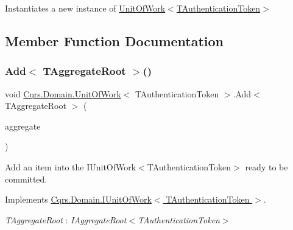 Instantiates a new instance of \hyperlink{classCqrs_1_1Domain_1_1UnitOfWork_a9ec92dbd580f3885f7cf5a9ad360e1ac_a9ec92dbd580f3885f7cf5a9ad360e1ac}{Unit\+Of\+Work$<$\+T\+Authentication\+Token$>$} 



\subsection{Member Function Documentation}
\mbox{\label{classCqrs_1_1Domain_1_1UnitOfWork_a840214f97d3661c7b5a739df65fadc9f_a840214f97d3661c7b5a739df65fadc9f}} 
\subsubsection{\texorpdfstring{Add$<$ T\+Aggregate\+Root $>$()}{Add< TAggregateRoot >()}}
{\footnotesize\ttfamily void \hyperlink{classCqrs_1_1Domain_1_1UnitOfWork}{Cqrs.\+Domain.\+Unit\+Of\+Work}$<$ T\+Authentication\+Token $>$.Add$<$ T\+Aggregate\+Root $>$ (\begin{DoxyParamCaption}\item[{T\+Aggregate\+Root}]{aggregate }\end{DoxyParamCaption})}



Add an item into the I\+Unit\+Of\+Work$<$\+T\+Authentication\+Token$>$ ready to be committed. 



Implements \hyperlink{interfaceCqrs_1_1Domain_1_1IUnitOfWork_a786ebca85b4ef7294b98280230ef1397_a786ebca85b4ef7294b98280230ef1397}{Cqrs.\+Domain.\+I\+Unit\+Of\+Work$<$ T\+Authentication\+Token $>$}.

\begin{Desc}
\item[Type Constraints]\begin{description}
\item[{\em T\+Aggregate\+Root} : {\em I\+Aggregate\+Root$<$T\+Authentication\+Token$>$}]\end{description}
\end{Desc}
\mbox{\label{classCqrs_1_1Domain_1_1UnitOfWork_a7401e41dd8ce4457551c252ca6402d31_a7401e41dd8ce4457551c252ca6402d31}} 
